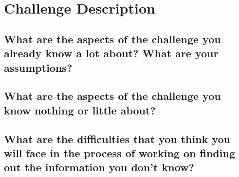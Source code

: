 \section{Challenge Description}
\label{sec_a}


\subsection{What are the aspects of the challenge you already know a lot about? 
What are your assumptions?}

\subsection{What are the aspects of the challenge you know nothing or little 
about?}

\subsection{What are the difficulties that you think you will face in the 
process of working on finding out the information you don’t know?}
